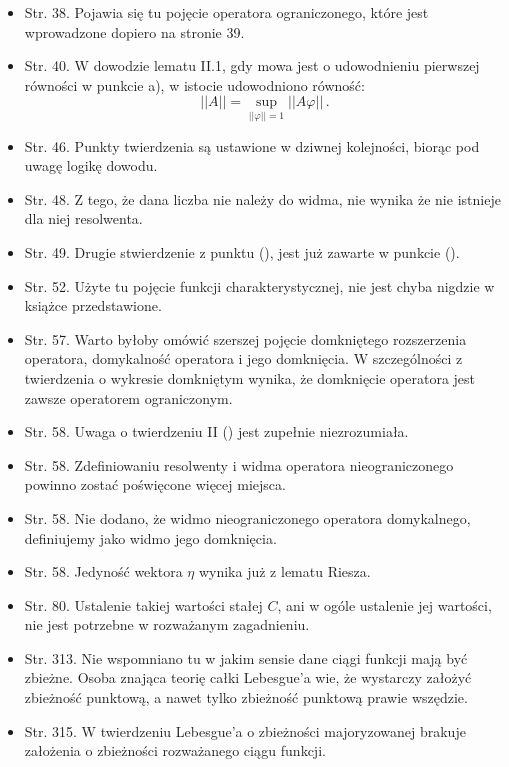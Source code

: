 \begin{itemize}
\item Str. 38. Pojawia się tu pojęcie operatora ograniczonego, które
  jest wprowadzone dopiero na stronie 39.
\item Str. 40. W dowodzie lematu II.1, gdy mowa jest o udowodnieniu
  pierwszej równości w punkcie a), w istocie udowodniono równość:
  $$|| A || = \sup_{ || \varphi || = 1 } || A \varphi || \, .$$
\item Str. 46. Punkty twierdzenia są ustawione w dziwnej kolejności,
  biorąc pod uwagę logikę dowodu.
\item Str. 48. Z tego, że dana liczba nie należy do widma, nie wynika
  że nie istnieje dla niej resolwenta.
\item Str. 49. Drugie stwierdzenie z punktu (), jest już
  zawarte w punkcie ().
\item Str. 52. Użyte tu pojęcie funkcji charakterystycznej, nie jest
  chyba nigdzie w książce przedstawione.
\item Str. 57. Warto byłoby omówić szerszej pojęcie domkniętego
  rozszerzenia operatora, domykalność operatora i jego domknięcia. W
  szczególności z twierdzenia o wykresie domkniętym wynika, że
  domknięcie operatora jest zawsze operatorem ograniczonym.
\item Str. 58. Uwaga o twierdzeniu II () jest zupełnie
  niezrozumiała.
\item Str. 58. Zdefiniowaniu resolwenty i widma operatora
  nieograniczonego powinno zostać poświęcone więcej miejsca.
\item Str. 58. Nie dodano, że widmo nieograniczonego operatora
  domykalnego, definiujemy jako widmo jego domknięcia.
\item Str. 58. Jedyność wektora $\eta$ wynika już z lematu Riesza.
\item Str. 80. Ustalenie takiej wartości stałej $C$, ani w ogóle
  ustalenie jej wartości, nie jest potrzebne w rozważanym zagadnieniu.
\item Str. 313. Nie wspomniano tu w jakim sensie dane ciągi funkcji
  mają być zbieżne. Osoba znająca teorię całki Lebesgue'a wie, że
  wystarczy założyć zbieżność punktową, a nawet tylko zbieżność
  punktową prawie wszędzie.
\item Str. 315. W twierdzeniu Lebesgue'a o zbieżności majoryzowanej
  brakuje założenia o zbieżności rozważanego ciągu funkcji.
\end{itemize}


